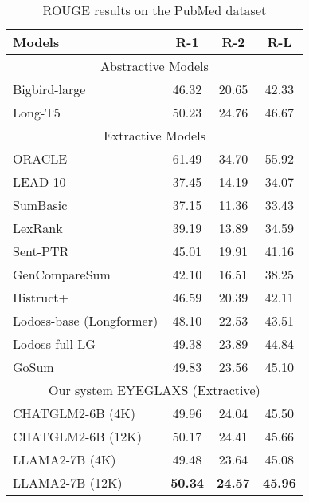 \begin{table}
    \centering
    \small
    \begin{tabular}{|l|c|c|c|} \hline 
         Models&  R-1&  R-2& R-L\\ \hline 
         \hline
         \multicolumn{4}{|c|}{Abstractive Models}\\ \hline 
         Bigbird-large&46.32&20.65&42.33\\ \hline 
         Long-T5&50.23  & 24.76 & 46.67 \\ \hline 
         \hline
         \multicolumn{4}{|c|}{Extractive Models}\\ \hline 
         ORACLE& 61.49 & 34.70 & 55.92 \\ \hline 
 LEAD-10& 37.45&14.19 &34.07\\ \hline 
 SumBasic& 37.15&11.36 &33.43\\ \hline 
 LexRank&39.19&13.89 &34.59 \\ \hline 
 Sent-PTR& 45.01&19.91 &41.16\\ \hline 
 GenCompareSum&42.10 &16.51 &38.25\\ \hline 
 Histruct+&46.59 & 20.39&42.11\\ \hline 
 Lodoss-base (Longformer)& 48.10&22.53 &43.51\\ \hline 
 Lodoss-full-LG& 49.38&23.89 &44.84\\ \hline 
 GoSum&49.83 &23.56 &45.10\\\hline \hline 
 \hline
 \multicolumn{4}{|c|}{Our system EYEGLAXS (Extractive)}\\ \hline 
 CHATGLM2-6B (4K)&49.96 &24.04 &45.50\\ \hline 
 CHATGLM2-6B (12K)&50.17 &24.41 &45.66\\ \hline 
 LLAMA2-7B (4K)&49.48 &23.64 &45.08\\ \hline 
 LLAMA2-7B (12K)&\textbf{50.34 }&\textbf{24.57} &\textbf{45.96}\\ \hline
    \end{tabular}
    \caption{ROUGE results on the PubMed dataset}
    \label{tab:result_pubmed}
\end{table}

